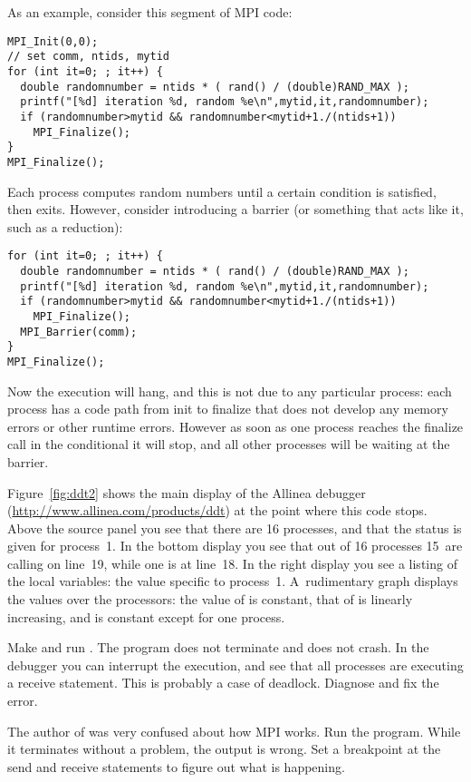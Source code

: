 As an example, consider this segment of MPI code:
\begin{verbatim}
MPI_Init(0,0);
// set comm, ntids, mytid
for (int it=0; ; it++) {
  double randomnumber = ntids * ( rand() / (double)RAND_MAX );
  printf("[%d] iteration %d, random %e\n",mytid,it,randomnumber);
  if (randomnumber>mytid && randomnumber<mytid+1./(ntids+1))  
    MPI_Finalize();
}
MPI_Finalize();
\end{verbatim}
Each process computes random numbers until a certain condition is satisfied, then exits.
However, consider introducing a barrier (or something that acts like it, such as a reduction):
\begin{verbatim}
for (int it=0; ; it++) {
  double randomnumber = ntids * ( rand() / (double)RAND_MAX );
  printf("[%d] iteration %d, random %e\n",mytid,it,randomnumber);
  if (randomnumber>mytid && randomnumber<mytid+1./(ntids+1))  
    MPI_Finalize();
  MPI_Barrier(comm);
}
MPI_Finalize();
\end{verbatim}
Now the execution will hang, and this is not due to any particular process:
each process has a code path from init to finalize that does not develop
any memory errors or other runtime errors.
However as soon as one process reaches the finalize call in the conditional
it will stop, and all other processes will be waiting at the barrier.

Figure~\ref{fig:ddt2} shows the main display of the Allinea 
debugger (\url{http://www.allinea.com/products/ddt}) at the point where this code stops.
Above the source panel you see that there are 16 processes, and that the status is given
for process~1.
In the bottom display you see that out of 16 processes 15~are calling  on line~19,
while one is at line~18. In the right display you see a listing of the local variables:
the value specific to process~1. A~rudimentary graph displays the values over the processors:
the value of  is constant, that of  is linearly increasing, and 
is constant except for one process.

\begin{exercise}
  Make and run . The program does not terminate and does not crash.
  In the debugger you can interrupt the execution, and see that all processes
  are executing a receive statement. This is probably a case of deadlock.
  Diagnose and fix the error.
\end{exercise}

\begin{exercise}
  The author of  was very confused about how MPI works. Run the program.
  While it terminates without a problem, the output is wrong. Set a breakpoint
  at the send and receive statements to figure out what is happening.
\end{exercise}



